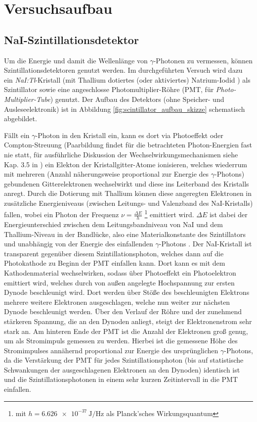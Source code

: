 \section{Versuchsaufbau}

\subsection{NaI-Szintillationsdetektor} \label{sec:nai_aufbau}

Um die Energie und damit die Wellenlänge von $\gamma$-Photonen zu vermessen, können Szintillationsdetektoren genutzt werden. Im durchgeführten Versuch wird dazu ein \textit{NaI:Tl}-Kristall (mit Thallium dotiertes (oder aktiviertes) Natrium-Iodid \cite[559-561]{gammahandbook}) als Szintillator sowie eine angeschlosse Photomultiplier-Röhre (PMT, für \textit{Photo-Multiplier-Tube}) genutzt. Der Aufbau des Detektors (ohne Speicher- und Ausleseelektronik) ist in Abbildung \ref{fig:scintillator_aufbau_skizze} schematisch abgebildet.

Fällt ein $\gamma$-Photon in den Kristall ein, kann es dort via Photoeffekt oder Compton-Streuung (Paarbildung findet für die betrachteten Photon-Energien fast nie statt, für ausführliche Diskussion der Wechselwirkungsmechanismen siehe Kap. 3.5 in \cite[74-88]{kolanoskiwermerdetektoren}) ein Elekton der Kristallgitter-Atome ionisieren, welches wiederrum mit mehreren (Anzahl näherungsweise proportional zur Energie des $\gamma$-Photons) gebundenen Gitterelektronen wechselwirkt und diese ins Leiterband des Kristalls anregt. Durch die Dotierung mit Thallium können diese angeregten Elektronen in zusätzliche Energieniveaus (zwischen Leitungs- und Valenzband des NaI-Kristalls) fallen, wobei ein Photon der Frequenz $\nu = \frac{\Delta E}{h}$ \footnote{mit $h=\SI{6.626e-37}{\joule\per\hertz}$ als Planck'sches Wirkungsquantum\cite{KonstantenNIST}} emittiert wird. $\Delta E$ ist dabei der Energieunterschied zwischen dem Leitungsbandniveau von NaI und dem Thallium-Niveau in der Bandlücke, also eine Materialkonstante des Szintillators und unabhängig von der Energie des einfallenden $\gamma$-Photons \cite[165-166]{leotechniques}.
Der NaI-Kristall ist transparent gegenüber diesem Szintillationsphoton, welches dann auf die Photokathode zu Beginn der PMT einfallen kann. Dort kann es mit dem Kathodenmaterial wechselwirken, sodass über Photoeffekt ein Photoelektron emittiert wird, welches durch von außen angelegte Hochspannung zur ersten Dynode beschleunigt wird. Dort werden über Stöße des beschleunigten Elektrons mehrere weitere Elektronen ausgeschlagen, welche nun weiter zur nächsten Dynode beschleunigt werden. Über den Verlauf der Röhre und der zunehmend stärkeren Spannung, die an den Dynoden anliegt, steigt der Elektronenstrom sehr stark an. Am hinteren Ende der PMT ist die Anzahl der Elektronen groß genug, um als Stromimpuls gemessen zu werden. Hierbei ist die gemessene Höhe des Stromimpulses annähernd proportional zur Energie des ursprünglichen $\gamma$-Photons, da die Verstärkung der PMT für jedes Szintillationsphoton (bis auf statistische Schwankungen der ausgeschlagenen Elektronen an den Dynoden) identisch ist \cite[563-565]{gammahandbook} und die Szintillationsphotonen in einem sehr kurzen Zeitintervall in die PMT einfallen.

